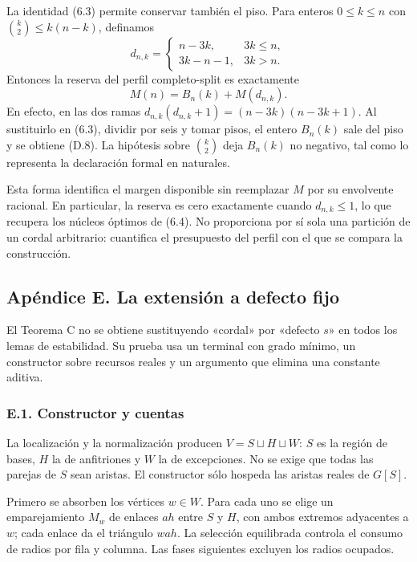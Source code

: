 \documentclass[spanish,11pt,a4paper]{article}
\begin{document}
La identidad (6.3) permite conservar también el piso. Para enteros \(0\le k\le n\) con \(\binom k2\le k(n-k)\), definamos \[
d_{n,k}=\begin{cases}n-3k,&3k\le n,\\3k-n-1,&3k>n.\end{cases}
\] Entonces la reserva del perfil completo-split es exactamente \[
M(n)=B_n(k)+M(d_{n,k}).
\tag{D.8}
\] En efecto, en las dos ramas \(d_{n,k}(d_{n,k}+1)=(n-3k)(n-3k+1)\). Al sustituirlo en (6.3), dividir por seis y tomar pisos, el entero \(B_n(k)\) sale del piso y se obtiene (D.8). La hipótesis sobre \(\binom k2\) deja \(B_n(k)\) no negativo, tal como lo representa la declaración formal en naturales.

Esta forma identifica el margen disponible sin reemplazar \(M\) por su envolvente racional. En particular, la reserva es cero exactamente cuando \(d_{n,k}\le1\), lo que recupera los núcleos óptimos de (6.4). No proporciona por sí sola una partición de un cordal arbitrario: cuantifica el presupuesto del perfil con el que se compara la construcción.

\subsection{Apéndice E. La extensión a defecto fijo}\label{apendice-e.-la-extension-a-defecto-fijo}

El Teorema C no se obtiene sustituyendo «cordal» por «defecto \(s\)» en todos los lemas de estabilidad. Su prueba usa un terminal con grado mínimo, un constructor sobre recursos reales y un argumento que elimina una constante aditiva.

\subsubsection{E.1. Constructor y cuentas}\label{e.1.-constructor-y-cuentas}

La localización y la normalización producen \(V=S\sqcup H\sqcup W\): \(S\) es la región de bases, \(H\) la de anfitriones y \(W\) la de excepciones. No se exige que todas las parejas de \(S\) sean aristas. El constructor sólo hospeda las aristas reales de \(G[S]\).

Primero se absorben los vértices \(w\in W\). Para cada uno se elige un emparejamiento \(M_w\) de enlaces \(ah\) entre \(S\) y \(H\), con ambos extremos adyacentes a \(w\); cada enlace da el triángulo \(wah\). La selección equilibrada controla el consumo de radios por fila y columna. Las fases siguientes excluyen los radios ocupados.
\end{document}
